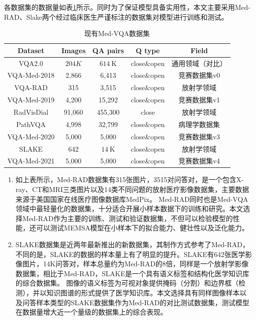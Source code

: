 各数据集的数据量如表\ref{tab:Date-set}所示。同时为了保证模型具备实用性，本文主要采用Med-RAD、Slake两个经过临床医生严谨标注的数据集对模型进行训练和测试。
\begin{table}
	\caption{\label{tab:Date-set}现有Med-VQA数据集}
	\centering
	\small
	\begin{tabular}{|c|c|c|c|c|}
		\hline Dataset & Images & QA pairs & Q type & Field \\
		\hline VQA2.0 & $204 K$ & $614 \mathrm{~K}$ & close\&open & 通用领域（对比） \\
		\hline VQA-Med-2018 & 2,866 & 6,413 & close\&open & 竞赛数据集v0 \\
		\hline VQA-RAD & 315 & 3,515 & close\&open & 放射学领域 \\
		\hline VQA-Med-2019 & 4,200 & 15,292 & close\&open  & 竞赛数据集v1 \\
		\hline RadVisDial & 91,060 & 455,300 & close & 放射学领域 \\
		\hline PathVQA & 4,998 & 32,799 & close\&open & 病理学数据集 \\
		\hline VQA-Med-2020 & 5,000 & 5,000 & close\&open  & 竞赛数据集v3 \\
		\hline SLAKE & 642 & $14 \mathrm{~K}$ & close\&open & 放射学领域 \\
		\hline VQA-Med-2021 & 5,000 & 5,000 & close\&open & 竞赛数据集v4 \\
		\hline
	\end{tabular}
\end{table}
%
\begin{enumerate}[topsep = 0 pt, itemsep= 0 pt, parsep=0pt, partopsep=0pt, leftmargin=44pt, itemindent=0pt, labelsep=6pt, label=(\arabic*)]
	\item 如上表所示，Med-RAD数据集有315张图片，3515对问答对，是一个包含X-ray、CT和MRI三类图片以及14类不同问题的放射医疗影像数据集，主要数据来源于美国国家在线医疗图像数据库MedPix。
	Med-RAD同时也是Med-VQA领域中最轻量化的数据集，十分适合开展小样本数据下的训练和研究。本文选择Med-RAD作为主要的训练、测试和验证数据集，不但可以检验模型的性能，还可以测试MEMSA模型在小样本下的拟合能力、健壮性以及泛化能力。
	\item SLAKE数据集是近两年最新推出的新数据集，其制作方式参考了Med-RAD，不同的是，SLAKE的数据的样本量上有了明显的提升。SLAKE有642张医学影像图片，14K问答对，样本总量约为Med-RAD的8倍，同样是一个放射学影像数据集，相比于Med-RAD，SLAKE是一个具有语义标签和结构化医学知识库的综合数据集。
	图像的语义标签为可视对象提供掩码（分割）和边界框（检测），并以知识图谱的形式提供了医学知识库。本文选择具有同样图像样本以及问答样本类型的SLAKE数据集作为Med-RAD的对比测试数据集，测试模型在数据量增大近一个量级的数据集上的综合表现。
\end{enumerate}

